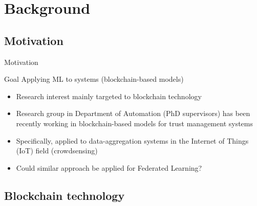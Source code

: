 

\section{Background}

\subsection{Motivation}

\begin{frame}{Motivation}
	\begin{block}{Goal}
        Applying ML to systems (blockchain-based models)
      \end{block}
  \begin{itemize}
    \item Research interest mainly targeted to \alert{blockchain technology}
    \item Research group in Department of Automation (PhD supervisors) has been recently working in blockchain-based models for \alert{trust management systems}
	\item Specifically, applied to data-aggregation systems in the Internet of Things (IoT) field (crowdsensing)
	\item Could similar approach be applied for \alert{Federated Learning}?
  \end{itemize}
\end{frame}

\subsection{Blockchain technology}

